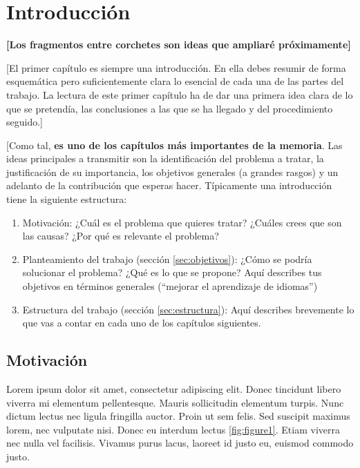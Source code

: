 \chapter{Introducción}\label{chap:introduccion}

\textbf{[Los fragmentos entre corchetes son ideas que ampliaré próximamente]}

[El primer capítulo es siempre una introducción. En ella debes resumir de forma esquemática pero suficientemente clara lo esencial de cada una de las partes del trabajo. La lectura de este primer capítulo ha de dar una primera idea clara de lo que se pretendía, las conclusiones a las que se ha llegado y del procedimiento seguido.]\par 
[Como tal, \textbf{es uno de los capítulos más importantes de la memoria}. Las ideas principales a transmitir son la identificación del problema a tratar, la justificación de su importancia, los objetivos generales (a grandes rasgos) y un adelanto de la contribución que esperas hacer. Típicamente una introducción tiene la siguiente estructura:\par

\begin{enumerate}
    \item Motivación: ¿Cuál es el problema que quieres tratar? ¿Cuáles crees que son las causas? ¿Por qué es relevante el problema?
    \item Planteamiento del trabajo (sección \ref{sec:objetivos}): ¿Cómo se podría solucionar el problema? ¿Qué es lo que se propone? Aquí describes tus objetivos en términos generales (``mejorar el aprendizaje de idiomas'')
    \item Estructura del trabajo (sección \ref{sec:estructura}): Aquí describes brevemente lo que vas a contar en cada uno de los capítulos siguientes.
\end{enumerate}

\section{Motivación}\label{sec:motivacion}
Lorem ipsum dolor sit amet, consectetur adipiscing elit. Donec tincidunt libero viverra mi elementum pellentesque. Mauris sollicitudin elementum turpis. Nunc dictum lectus nec ligula fringilla auctor. Proin ut sem felis. Sed suscipit maximus lorem, nec vulputate nisi. Donec eu interdum lectus \ref{fig:figure1}. Etiam viverra nec nulla vel facilisis. Vivamus purus lacus, laoreet id justo eu, euismod commodo justo.\par

